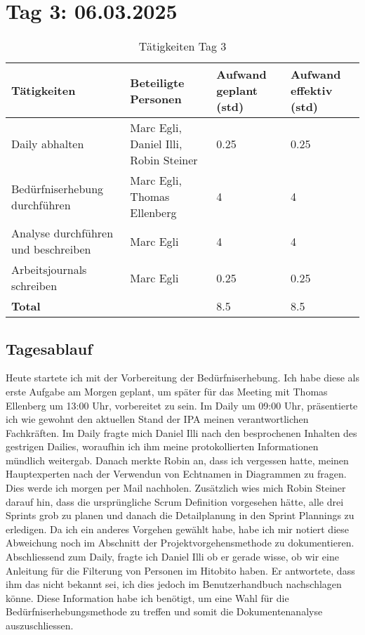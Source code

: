 \section{Tag 3: 06.03.2025}
\begin{table}[H]
    \begin{tabular}{|L{0.4\textwidth}|C{60pt}|C{60pt}|C{60pt}|}
        \hline
        \color{white}Tätigkeiten & \color{white}Beteiligte \color{white}Personen & \color{white}Aufwand geplant (std) & \color{white}Aufwand effektiv (std) \\
        \hline
        Daily abhalten & Marc Egli, Daniel Illi, Robin Steiner & 0.25 & 0.25 \\
        \hline
        Bedürfniserhebung durchführen & Marc Egli, Thomas Ellenberg & 4 & 4 \\
        \hline
        Analyse durchführen und beschreiben & Marc Egli & 4 & 4 \\
        \hline
        Arbeitsjournals schreiben & Marc Egli & 0.25 & 0.25 \\
        \textbf{Total} &   & 8.5 & 8.5 \\
        \hline
    \end{tabular}
    \caption{Tätigkeiten Tag 3}
\end{table}

\subsection*{Tagesablauf}
Heute startete ich mit der Vorbereitung der Bedürfniserhebung. Ich habe diese als erste Aufgabe am Morgen geplant,
um später für das Meeting mit Thomas Ellenberg um 13:00 Uhr, vorbereitet zu sein. Im Daily um 09:00 Uhr, präsentierte ich wie gewohnt den 
aktuellen Stand der IPA meinen verantwortlichen Fachkräften. Im Daily fragte mich Daniel Illi nach den besprochenen Inhalten des gestrigen Dailies,
woraufhin ich ihm meine protokollierten Informationen mündlich weitergab. Danach merkte Robin an, dass ich vergessen hatte, meinen Hauptexperten nach der 
Verwendun von Echtnamen in Diagrammen zu fragen. Dies werde ich morgen per Mail nachholen. Zusätzlich wies mich Robin Steiner darauf hin, dass die ursprüngliche
Scrum Definition vorgesehen hätte, alle drei Sprints grob zu planen und danach die Detailplanung in den Sprint Plannings zu erledigen. Da ich ein anderes Vorgehen gewählt
habe, habe ich mir notiert diese Abweichung noch im Abschnitt der Projektvorgehensmethode zu dokumentieren. Abschliessend zum Daily, fragte ich Daniel Illi ob er gerade
wisse, ob wir eine Anleitung für die Filterung von Personen im Hitobito haben. Er antwortete, dass ihm das nicht bekannt sei, ich dies jedoch im Benutzerhandbuch nachschlagen
könne. Diese Information habe ich benötigt, um eine Wahl für die Bedürfniserhebungsmethode zu treffen und somit die Dokumentenanalyse
auszuschliessen.

